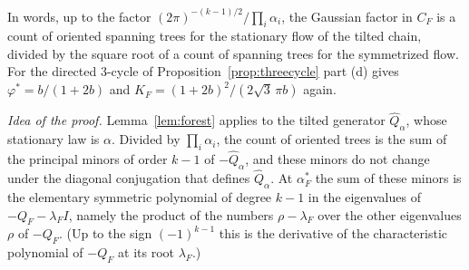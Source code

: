 In words, up to the factor $(2\pi)^{-(k-1)/2}/\prod_i\alpha_i$, the Gaussian factor in $C_F$ is a count of oriented
spanning trees for the stationary flow of the tilted chain, divided by the square root of a count
of spanning trees for the symmetrized flow. For the directed $3$-cycle of Proposition~\ref{prop:threecycle} part (d) gives
$\varphi^*=b/(1+2b)$ and $K_F=(1+2b)^2/(2\sqrt3\,\pi b)$ again.

\emph{Idea of the proof.} Lemma~\ref{lem:forest} applies to the tilted generator
$\widehat Q_\alpha$, whose stationary law is $\alpha$. Divided by $\prod_i\alpha_i$, the count of
oriented trees is the sum of the principal minors of order $k-1$ of $-\widehat Q_\alpha$, and
these minors do not change under the diagonal conjugation that defines $\widehat Q_\alpha$. At $\alpha^*_F$ the sum of these minors is the elementary symmetric
polynomial of degree $k-1$ in the eigenvalues of $-Q_F-\lambda_FI$, namely the product of the
numbers $\rho-\lambda_F$ over the other eigenvalues $\rho$ of $-Q_F$. (Up to the sign
$(-1)^{k-1}$ this is the derivative of the characteristic polynomial of $-Q_F$ at its root
$\lambda_F$.)

